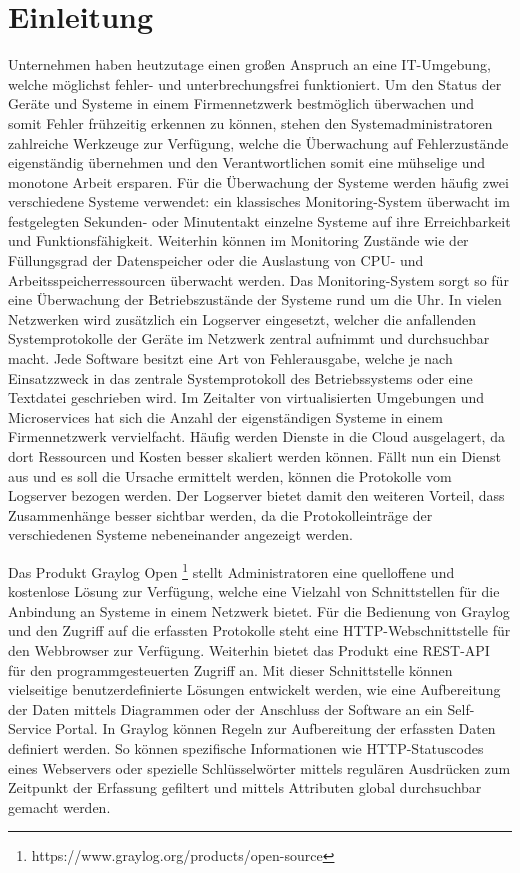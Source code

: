 \chapter{Einleitung}

Unternehmen haben heutzutage einen großen Anspruch an eine IT-Umgebung, welche möglichst fehler- und unterbrechungsfrei funktioniert. Um den Status der Geräte und Systeme in einem Firmennetzwerk bestmöglich überwachen und somit Fehler frühzeitig erkennen zu können, stehen den Systemadministratoren zahlreiche Werkzeuge zur Verfügung, welche die Überwachung auf Fehlerzustände eigenständig übernehmen und den Verantwortlichen somit eine mühselige und monotone Arbeit ersparen. Für die Überwachung der Systeme werden häufig zwei verschiedene Systeme verwendet: ein klassisches Monitoring-System überwacht im festgelegten Sekunden- oder Minutentakt einzelne Systeme auf ihre Erreichbarkeit und Funktionsfähigkeit. Weiterhin können im Monitoring Zustände wie der Füllungsgrad der Datenspeicher oder die Auslastung von CPU- und Arbeitsspeicherressourcen überwacht werden. Das Monitoring-System sorgt so für eine Überwachung der Betriebszustände der Systeme rund um die Uhr. In vielen Netzwerken wird zusätzlich ein Logserver eingesetzt, welcher die anfallenden Systemprotokolle der Geräte im Netzwerk zentral aufnimmt und durchsuchbar macht. Jede Software besitzt eine Art von Fehlerausgabe, welche je nach Einsatzzweck in das zentrale Systemprotokoll des Betriebssystems oder eine Textdatei geschrieben wird. Im Zeitalter von virtualisierten Umgebungen und Microservices hat sich die Anzahl der eigenständigen Systeme in einem Firmennetzwerk vervielfacht. Häufig werden Dienste in die Cloud ausgelagert, da dort Ressourcen und Kosten besser skaliert werden können. Fällt nun ein Dienst aus und es soll die Ursache ermittelt werden, können die Protokolle vom Logserver bezogen werden. Der Logserver bietet damit den weiteren Vorteil, dass Zusammenhänge besser sichtbar werden, da die Protokolleinträge der verschiedenen Systeme nebeneinander angezeigt werden. 

Das Produkt Graylog Open \footnote{https://www.graylog.org/products/open-source} stellt Administratoren eine quelloffene und kostenlose Lösung zur Verfügung, welche eine Vielzahl von Schnittstellen für die Anbindung an Systeme in einem Netzwerk bietet. Für die Bedienung von Graylog und den Zugriff auf die erfassten Protokolle steht eine HTTP-Webschnittstelle für den Webbrowser zur Verfügung. Weiterhin bietet das Produkt eine REST-API für den programmgesteuerten Zugriff an. Mit dieser Schnittstelle können vielseitige benutzerdefinierte Lösungen entwickelt werden, wie eine Aufbereitung der Daten mittels Diagrammen oder der Anschluss der Software an ein Self-Service Portal. In Graylog können Regeln zur Aufbereitung der erfassten Daten definiert werden. So können spezifische Informationen wie HTTP-Statuscodes eines Webservers oder spezielle Schlüsselwörter mittels regulären Ausdrücken zum Zeitpunkt der Erfassung gefiltert und mittels Attributen global durchsuchbar gemacht werden.


